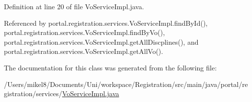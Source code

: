 Definition at line 20 of file VoServiceImpl.java.



Referenced by portal.registration.services.VoServiceImpl.findById(), portal.registration.services.VoServiceImpl.findByVo(), portal.registration.services.VoServiceImpl.getAllDiscplines(), and portal.registration.services.VoServiceImpl.getAllVo().



The documentation for this class was generated from the following file:\begin{DoxyCompactItemize}
\item 
/Users/mikel8/Documents/Uni/workspace/Registration/src/main/java/portal/registration/services/\hyperlink{VoServiceImpl_8java}{VoServiceImpl.java}\end{DoxyCompactItemize}
